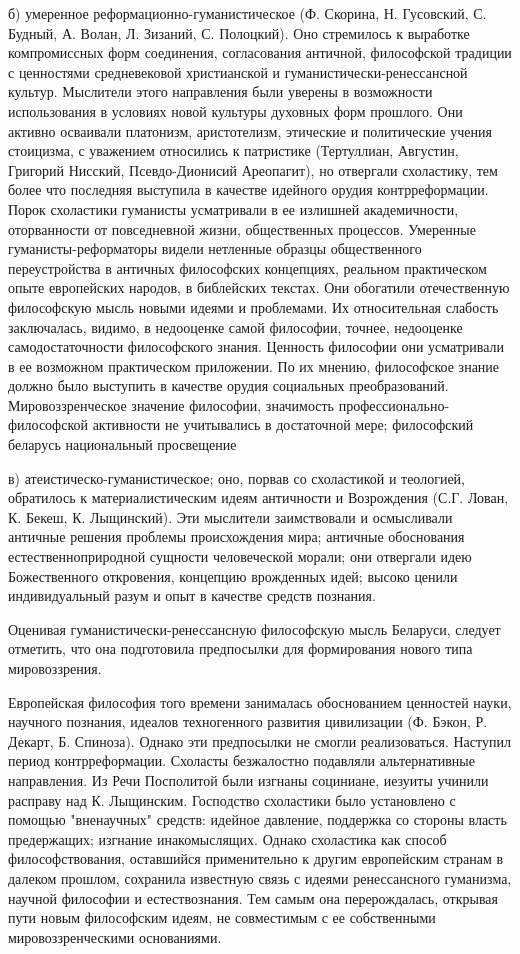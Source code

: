 б) умеренное реформационно-гуманистическое (Ф. Скорина, Н. Гусовский, С. Будный, А. Волан, Л. Зизаний, С. Полоцкий). Оно стремилось к выработке компромиссных форм соединения, согласования античной, философской традиции с ценностями средневековой христианской и гуманистически-ренессансной культур. Мыслители этого направления были уверены в возможности использования в условиях новой культуры духовных форм прошлого. Они активно осваивали платонизм, аристотелизм, этические и политические учения стоицизма, с уважением относились к патристике (Тертуллиан, Августин, Григорий Нисский, Псевдо-Дионисий Ареопагит), но отвергали схоластику, тем более что последняя выступила в качестве идейного орудия контрреформации. Порок схоластики гуманисты усматривали в ее излишней академичности, оторванности от повседневной жизни, общественных процессов. Умеренные гуманисты-реформаторы видели нетленные образцы общественного переустройства в античных философских концепциях, реальном практическом опыте европейских народов, в библейских текстах. Они обогатили отечественную философскую мысль новыми идеями и проблемами. Их относительная слабость заключалась, видимо, в недооценке самой философии, точнее, недооценке самодостаточности философского знания. Ценность философии они усматривали в ее возможном практическом приложении. По их мнению, философское знание должно было выступить в качестве орудия социальных преобразований. Мировоззренческое значение философии, значимость профессионально-философской активности не учитывались в достаточной мере; философский беларусь национальный просвещение

в) атеистическо-гуманистическое; оно, порвав со схоластикой и теологией, обратилось к материалистическим идеям античности и Возрождения (С.Г. Лован, К. Бекеш, К. Лыщинский). Эти мыслители заимствовали и осмысливали античные решения проблемы происхождения мира; античные обоснования естественноприродной сущности человеческой морали; они отвергали идею Божественного откровения, концепцию врожденных идей; высоко ценили индивидуальный разум и опыт в качестве средств познания.

Оценивая гуманистически-ренессансную философскую мысль Беларуси, следует отметить, что она подготовила предпосылки для формирования нового типа мировоззрения.

Европейская философия того времени занималась обоснованием ценностей науки, научного познания, идеалов техногенного развития цивилизации (Ф. Бэкон, Р. Декарт, Б. Спиноза). Однако эти предпосылки не смогли реализоваться. Наступил период контрреформации. Схоласты безжалостно подавляли альтернативные направления. Из Речи Посполитой были изгнаны социниане, иезуиты учинили расправу над К. Лыщинским. Господство схоластики было установлено с помощью "вненаучных" средств: идейное давление, поддержка со стороны власть предержащих; изгнание инакомыслящих. Однако схоластика как способ философствования, оставшийся применительно к другим европейским странам в далеком прошлом, сохранила известную связь с идеями ренессансного гуманизма, научной философии и естествознания. Тем самым она перерождалась, открывая пути новым философским идеям, не совместимым с ее собственными мировоззренческими основаниями.

